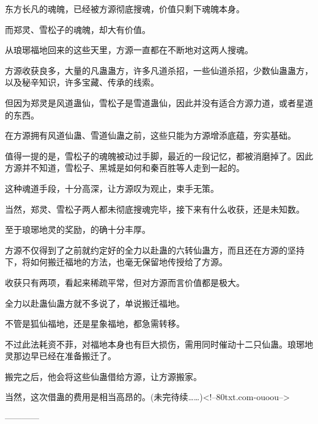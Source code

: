 \begin{this_body}
东方长凡的魂魄，已经被方源彻底搜魂，价值只剩下魂魄本身。

而郑灵、雪松子的魂魄，却大有价值。

从琅琊福地回来的这些天里，方源一直都在不断地对这两人搜魂。

方源收获良多，大量的凡蛊蛊方，许多凡道杀招，一些仙道杀招，少数仙蛊蛊方，以及秘辛知识，许多宝藏、传承的线索。

但因为郑灵是风道蛊仙，雪松子是雪道蛊仙，因此并没有适合方源力道，或者星道的东西。

在方源拥有风道仙蛊、雪道仙蛊之前，这些只能为方源增添底蕴，夯实基础。

值得一提的是，雪松子的魂魄被动过手脚，最近的一段记忆，都被消磨掉了。因此方源并不知道，雪松子、黑城是如何和秦百胜等人走到一起的。

这种魂道手段，十分高深，让方源叹为观止，束手无策。

当然，郑灵、雪松子两人都未彻底搜魂完毕，接下来有什么收获，还是未知数。

至于琅琊地灵的奖励，的确十分丰厚。

方源不仅得到了之前就约定好的全力以赴蛊的六转仙蛊方，而且还在方源的坚持下，将如何搬迁福地的方法，也毫无保留地传授给了方源。

收获只有两项，看起来稀疏平常，但对方源而言价值都是极大。

全力以赴蛊仙蛊方就不多说了，单说搬迁福地。

不管是狐仙福地，还是星象福地，都急需转移。

不过此法耗资不菲，对福地本身也有巨大损伤，需用同时催动十二只仙蛊。琅琊地灵那边早已经在准备搬迁了。

搬完之后，他会将这些仙蛊借给方源，让方源搬家。

当然，这次借蛊的费用是相当高昂的。(未完待续……)<!--80txt.com-ouoou-->

------------

\end{this_body}

